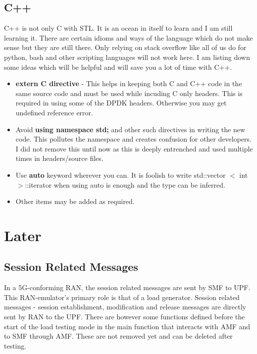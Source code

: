 \documentclass{article}
\begin{document}
\subsection{C++}
C++ is not only C with STL. It is an ocean in itself to learn and I am still learning it. There are certain idioms and ways of the language which do not make sense but they are still there. Only relying on stack overflow like all of us do for python, bash and other scripting languages will not work here. I am listing down some ideas which will be helpful and will save you a lot of time with C++.
\begin{itemize}
    \item \textbf{extern C directive} - This helps in keeping both C and C++ code in the same source code and must be used while incuding C only headers. This is  required in using some of the DPDK headers. Otherwise you may get undefined reference error.
    \item Avoid \textbf{using namespace std;} and other such directives in writing the new code. This pollutes the namespace and creates confusion for other developers. I did not remove this until now as this is deeply entrenched and used multiple times in headers/source files.
    \item Use \textbf{auto} keyword wherever you can. It is foolish to write std::vector $<$ int$>$::iterator when using auto is enough and the type can be inferred.
    \item Other items may be added as required.
\end{itemize}
\section{Later}
\subsection{Session Related Messages}
In a 5G-conforming RAN, the session related messages are sent by SMF to UPF.
This RAN-emulator's primary role is that of a load generator. Session related messages - session establishment, modification and release messages are directly sent by RAN to the UPF.
There are however some functions defined before the start of the load testing mode in the main function that interacts with AMF and to SMF through AMF. These are not removed yet and can be deleted after testing.
\end{document}
